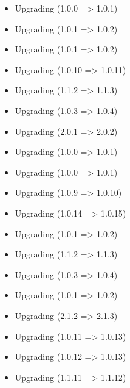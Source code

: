     \begin{itemize}
        \item Upgrading  (1.0.0 => 1.0.1)
        \item Upgrading  (1.0.1 => 1.0.2)
        \item Upgrading  (1.0.1 => 1.0.2)
        \item Upgrading  (1.0.10 => 1.0.11)
        \item Upgrading  (1.1.2 => 1.1.3)
        \item Upgrading  (1.0.3 => 1.0.4)
        \item Upgrading  (2.0.1 => 2.0.2)
        \item Upgrading  (1.0.0 => 1.0.1)
        \item Upgrading  (1.0.0 => 1.0.1)
        \item Upgrading  (1.0.9 => 1.0.10)
        \item Upgrading  (1.0.14 => 1.0.15)
        \item Upgrading  (1.0.1 => 1.0.2)
        \item Upgrading  (1.1.2 => 1.1.3)
        \item Upgrading  (1.0.3 => 1.0.4)
        \item Upgrading  (1.0.1 => 1.0.2)
        \item Upgrading  (2.1.2 => 2.1.3)
        \item Upgrading  (1.0.11 => 1.0.13)
        \item Upgrading  (1.0.12 => 1.0.13)
        \item Upgrading  (1.1.11 => 1.1.12)
    \end{itemize}

